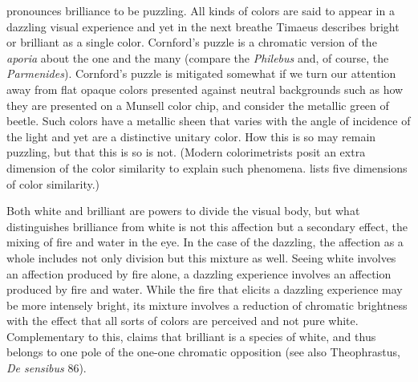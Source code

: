 \citet[277--8]{Cornford:1935fk} pronounces brilliance to be puzzling. All kinds of colors are said to appear in a dazzling visual experience and yet in the next breathe Timaeus describes bright or brilliant as a single color. Cornford's puzzle is a chromatic version of the \emph{aporia} about the one and the many (compare the \emph{Philebus} and, of course, the \emph{Parmenides}). Cornford's puzzle is mitigated somewhat if we turn our attention away from flat opaque colors presented against neutral backgrounds such as how they are presented on a Munsell color chip, and consider the metallic green of beetle. Such colors have a metallic sheen that varies with the angle of incidence of the light and yet are a distinctive unitary color. How this is so may remain puzzling, but that this is so is not. (Modern colorimetrists posit an extra dimension of the color similarity to explain such phenomena. \citealt{Fairchild:2005vd} lists five dimensions of color similarity.)

Both white and brilliant are powers to divide the visual body, but what distinguishes brilliance from white is not this affection but a secondary effect, the mixing of fire and water in the eye. In the case of the dazzling, the affection as a whole includes not only division but this mixture as well. Seeing white involves an affection produced by fire alone, a dazzling experience involves an affection produced by fire and water. While the fire that elicits a dazzling experience may be more intensely bright, its mixture involves a reduction of chromatic brightness with the effect that all sorts of colors are perceived and not pure white. Complementary to this, \citet[10--1]{Levides:2002aa} claims that brilliant is a species of white, and thus belongs to one pole of the one-one chromatic opposition (see also Theophrastus, \emph{De sensibus} 86).

